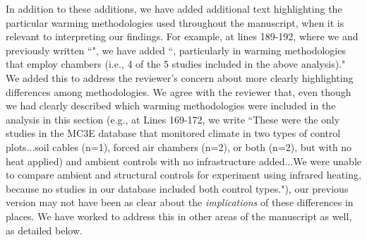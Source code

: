 \documentclass[11pt,a4paper]{letter}
\begin{document}
\begin{letter}{}
\begin{enumerate}
\begin{enumerate}
\par In addition to these additions, we have added additional text highlighting the particular warming methodologies used throughout the manuscript, when it is relevant to interpreting our findings. For example, at lines 189-192, where we and previously written ``", we have added ``, particularly in warming methodologies that employ chambers (i.e., 4 of the 5 studies included in the above analysis)." We added this to address the reviewer's concern about more clearly highlighting differences among methodologies. We agree with the reviewer that, even though we had clearly described which warming methodologies were included in the analysis in this section (e.g., at Lines 169-172, we write ``These were the only studies in the MC3E database that monitored climate in two types of control plots...soil cables (n=1), forced air chambers (n=2), or both (n=2), but with no heat applied) and ambient controls with no infrastructure added...We were unable to compare ambient and structural controls for experiment using infrared heating, because no studies in our database included both control types."), our previous version may not have been as clear about the \emph{implications} of these differences in places. We have worked to address this in other areas of the manuscript as well, as detailed below.\\


\end{enumerate}
\end{enumerate}
\end{letter}
\end{document}
